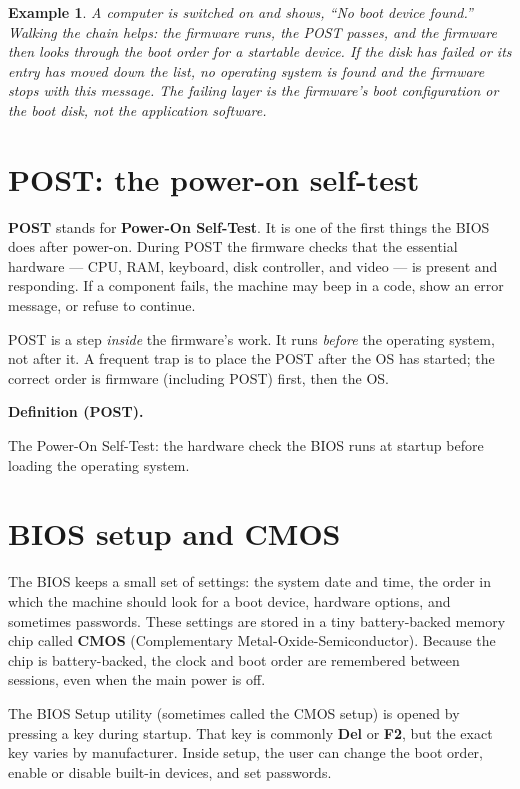 \documentclass[11pt]{article}
\newtheorem{example}{Example}[section]
\newenvironment{definitionbox}[1]{%
  \par\noindent\textbf{Definition (#1).}\ \itshape
}{\par\vspace{0.3em}}
\begin{document}
\begin{example}
A computer is switched on and shows, ``No boot device found.'' Walking the
chain helps: the firmware runs, the POST passes, and the firmware then looks
through the boot order for a startable device. If the disk has failed or its
entry has moved down the list, no operating system is found and the firmware
stops with this message. The failing layer is the firmware's boot
configuration or the boot disk, not the application software.
\end{example}

\section{POST: the power-on self-test}
\textbf{POST} stands for \textbf{Power-On Self-Test}. It is one of the first
things the BIOS does after power-on. During POST the firmware checks that the
essential hardware --- CPU, RAM, keyboard, disk controller, and video --- is
present and responding. If a component fails, the machine may beep in a code,
show an error message, or refuse to continue.

POST is a step \emph{inside} the firmware's work. It runs \emph{before} the
operating system, not after it. A frequent trap is to place the POST after
the OS has started; the correct order is firmware (including POST) first,
then the OS.

\begin{definitionbox}{POST}
The Power-On Self-Test: the hardware check the BIOS runs at startup before
loading the operating system.
\end{definitionbox}

\section{BIOS setup and CMOS}
The BIOS keeps a small set of settings: the system date and time, the order
in which the machine should look for a boot device, hardware options, and
sometimes passwords. These settings are stored in a tiny battery-backed
memory chip called \textbf{CMOS} (Complementary
Metal-Oxide-Semiconductor). Because the chip is battery-backed, the clock
and boot order are remembered between sessions, even when the main power is
off.

The BIOS Setup utility (sometimes called the CMOS setup) is opened by
pressing a key during startup. That key is commonly \textbf{Del} or
\textbf{F2}, but the exact key varies by manufacturer. Inside setup, the
user can change the boot order, enable or disable built-in devices, and set
passwords.
\end{document}
